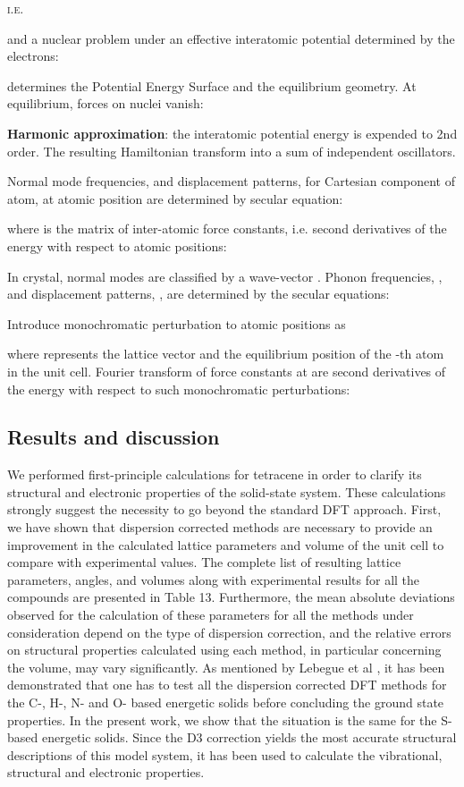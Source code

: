  
 \textsc{i.e.}
 
 and a nuclear problem under an effective interatomic potential determined by the electrons:
 
 determines the Potential Energy Surface and the equilibrium geometry. At equilibrium, forces on nuclei vanish:
 
 \textbf{Harmonic approximation}: the interatomic potential energy is expended to 2nd order. The resulting Hamiltonian transform into a sum of independent oscillators.
 
 Normal mode frequencies, and displacement patterns,  for Cartesian component  of atom, at atomic position  are determined by secular equation:
 
 where is the matrix of inter-atomic force constants, i.e. second derivatives of the energy with respect to atomic positions:
 
 In crystal, normal modes are classified by a wave-vector . Phonon frequencies, , and displacement patterns, , are determined by the secular equations:
 
 Introduce monochromatic perturbation to atomic positions as
 
 where represents the lattice vector and the equilibrium position of the -th atom in the unit cell.
 Fourier transform of force constants at  are second derivatives of the energy with respect to such monochromatic perturbations:
 
 \subsection{Results and discussion}
 
 We performed first-principle calculations for tetracene in order to clarify its structural and electronic properties of the solid-state system. These calculations strongly suggest the necessity to go beyond the standard DFT approach. First, we have shown that dispersion corrected methods are necessary to provide an improvement in the calculated lattice parameters and volume of the unit cell to compare with experimental values. The complete list of resulting lattice parameters, angles, and volumes along with experimental results for all the compounds are presented in Table 13. Furthermore, the mean absolute deviations observed for the calculation of these parameters for all the methods under consideration depend on the type of dispersion correction, and the relative errors on structural properties calculated using each method, in particular concerning the volume, may vary significantly. As mentioned by Lebegue et al \cite{appalakondaiah2015dispersion}, it has been demonstrated that one has to test all the dispersion corrected DFT methods for the C-, H-, N- and O- based energetic solids before concluding the ground state properties. In the present work, we show that the situation is the same for the S-based energetic solids. Since the D3 correction yields the most accurate structural descriptions of this model system, it has been used to calculate the vibrational, structural and electronic properties.
 
